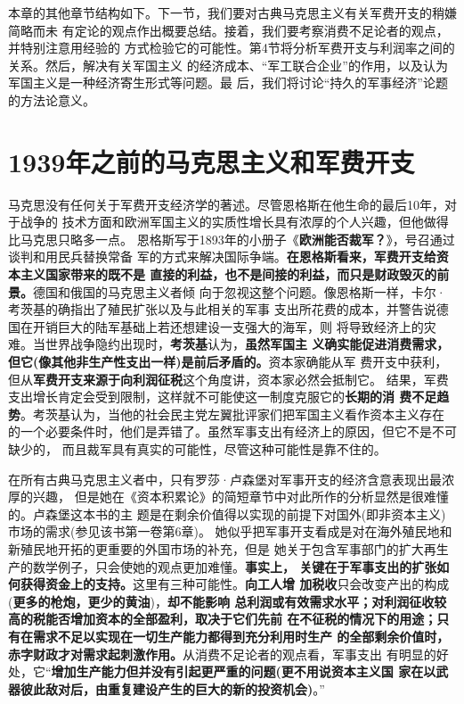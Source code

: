 本章的其他章节结构如下。下一节，我们要对古典马克思主义有关军费开支的稍嫌简略而未
有定论的观点作出概要总结。接着，我们要考察消费不足论者的观点，并特别注意用经验的
方式检验它的可能性。第4节将分析军费开支与利润率之间的关系。然后，解决有关军国主义
的经济成本、“军工联合企业”的作用，以及认为军国主义是一种经济寄生形式等问题。最
后，我们将讨论“持久的军事经济”论题的方法论意义。

\section{1939年之前的马克思主义和军费开支}
马克思没有任何关于军费开支经济学的著述。尽管恩格斯在他生命的最后10年，对于战争的
技术方面和欧洲军国主义的实质性增长具有浓厚的个人兴趣，但他做得比马克思只略多一点。
恩格斯写于1893年的小册子《\textbf{欧洲能否裁军？}》，号召通过谈判和用民兵替换常备
军的方式来解决国际争端。\textbf{在恩格斯看来，军费开支给资本主义国家带来的既不是
  直接的利益，也不是间接的利益，而只是财政毁灭的前景。}德国和俄国的马克思主义者倾
向于忽视这整个问题。像恩格斯一样，卡尔·考茨基的确指出了殖民扩张以及与此相关的军事
支出所花费的成本，并警告说德国在开销巨大的陆军基础上若还想建设一支强大的海军，则
将导致经济上的灾难。当世界战争隐约出现时，\textbf{考茨基}认为，\textbf{虽然军国主
  义确实能促进消费需求，但它(像其他非生产性支出一样)是前后矛盾的。}资本家确能从军
费开支中获利，但从\textbf{军费开支来源于向利润征税}这个角度讲，资本家必然会抵制它。
结果，军费支出增长肯定会受到限制，这样就不可能使这一制度克服它的\textbf{长期的消
  费不足趋势}。考茨基认为，当他的社会民主党左翼批评家们把军国主义看作资本主义存在
的一个必要条件时，他们是弄错了。虽然军事支出有经济上的原因，但它不是不可缺少的，
而且裁军具有真实的可能性，尽管这种可能性是靠不住的。

在所有古典马克思主义者中，只有罗莎·卢森堡对军事开支的经济含意表现出最浓厚的兴趣，
但是她在《资本积累论》的简短章节中对此所作的分析显然是很难懂的。卢森堡这本书的主
题是在剩余价值得以实现的前提下对国外(即非资本主义)市场的需求(参见该书第一卷第6章)。
她似乎把军事开支看成是对在海外殖民地和新殖民地开拓的更重要的外国市场的补充，但是
她关于包含军事部门的扩大再生产的数学例子，只会使她的观点更加难懂。\textbf{事实上，
  关键在于军事支出的扩张如何获得资金上的支持。}这里有三种可能性。\textbf{向工人增
  加税收}只会改变产出的构成(\textbf{更多的枪炮，更少的黄油})，\textbf{却不能影响
  总利润或有效需求水平；对利润征收较高的税能否增加资本的全部盈利，取决于它们先前
  在不征税的情况下的用途；只有在需求不足以实现在一切生产能力都得到充分利用时生产
  的全部剩余价值时，赤字财政才对需求起刺激作用。}从消费不足论者的观点看，军事支出
有明显的好处，它“\textbf{增加生产能力但并没有引起更严重的问题(更不用说资本主义国
  家在以武器彼此敌对后，由重复建设产生的巨大的新的投资机会)}。”

